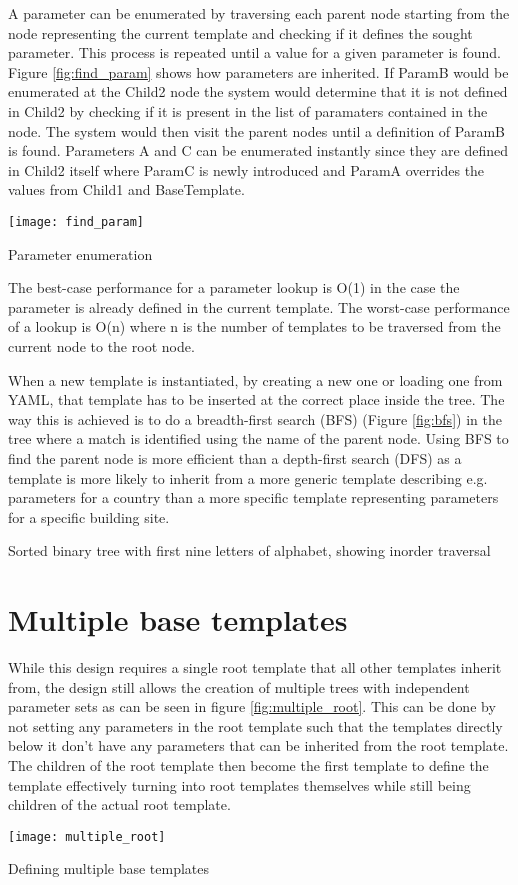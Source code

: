A parameter can be enumerated by traversing each parent node starting from the node representing the current template and checking if it defines the sought parameter.
This process is repeated until a value for a given parameter is found.
Figure \ref{fig:find_param} shows how parameters are inherited.
If ParamB would be enumerated at the Child2 node the system would determine that it is not defined in Child2 by checking if it is present in the list of paramaters contained in the node.
The system would then visit the parent nodes until a definition of ParamB is found.
Parameters A and C can be enumerated instantly since they are defined in Child2 itself where ParamC is newly introduced and ParamA overrides the values from Child1 and BaseTemplate.
\begin{marginfigure}
	\centering
	\texttt{[image: find\_param]}
	\caption{Parameter enumeration}
	\label{fig:find_param}
\end{marginfigure}
The best-case performance for a parameter lookup is O(1) in the case the parameter is already defined in the current template.
The worst-case performance of a lookup is O(n) where n is the number of templates to be traversed from the current node to the root node.

When a new template is instantiated, by creating a new one or loading one from YAML, that template has to be inserted at the correct place inside the tree.
The way this is achieved is to do a breadth-first search (BFS) (Figure \ref{fig:bfs}) in the tree where a match is identified using the name of the parent node.
Using BFS to find the parent node is more efficient than a depth-first search (DFS) as a template is more likely to inherit from a more generic template describing e.g. parameters for a country than a more specific template representing parameters for a specific building site.
\begin{marginfigure}
	\centering
	
	\caption{Sorted binary tree with first nine letters of alphabet, showing inorder traversal\cite{pluke_sorted_2010}}
	\label{fig:bfs}
\end{marginfigure}

\section{Multiple base templates} %
While this design requires a single root template that all other templates inherit from, the design still allows the creation of multiple trees with independent parameter sets as can be seen in figure \ref{fig:multiple_root}.
This can be done by not setting any parameters in the root template such that the templates directly below it don't have any parameters that can be inherited from the root template.
The children of the root template then become the first template to define the template effectively turning into root templates themselves while still being children of the actual root template.
\begin{marginfigure}
	\centering
	\texttt{[image: multiple\_root]}
	\caption{Defining multiple base templates}
	\label{fig:multiple_root}
\end{marginfigure}

